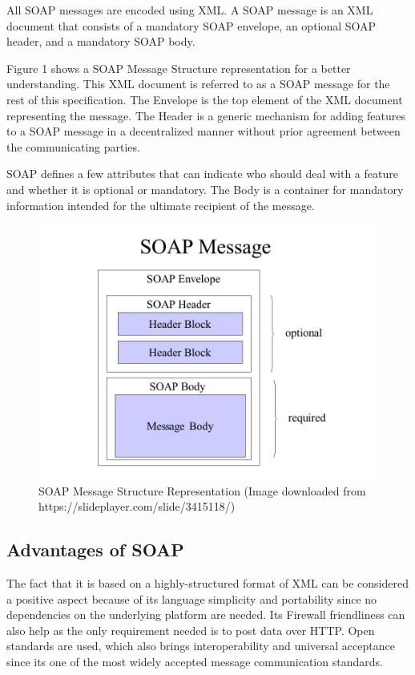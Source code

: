\documentclass[conference]{IEEEtran}
\begin{document}
All SOAP messages are encoded using XML. A SOAP message is an XML document that consists of a mandatory SOAP envelope, an optional SOAP header, and a mandatory SOAP body. 

Figure 1 shows a SOAP Message Structure representation for a better understanding. This XML document is referred to as a SOAP message for the rest of this specification. The Envelope is the top element of the XML document representing the message. The Header is a generic mechanism for adding features to a SOAP message in a decentralized manner without prior agreement between the communicating parties. \cite{SOA-W3C-2000}

SOAP defines a few attributes that can indicate who should deal with a feature and whether it is optional or mandatory. The Body is a container for mandatory information intended for the ultimate recipient of the message.\cite{SOA-W3C-2000}

\begin{figure}
	\centering
	\includegraphics[width=0.8\linewidth]{soap_message.jpg}
	\caption{SOAP Message Structure Representation (Image downloaded from https://slideplayer.com/slide/3415118/)}
\end{figure}

\subsection{Advantages of SOAP}

The fact that it is based on a highly-structured format of XML can be considered a positive aspect because of its language simplicity and portability since no dependencies on the underlying platform are needed. Its Firewall friendliness can also help as the only requirement needed is to post data over HTTP. Open standards are used, which also brings interoperability and universal acceptance since its one of the most widely accepted message communication standards.
\end{document}
